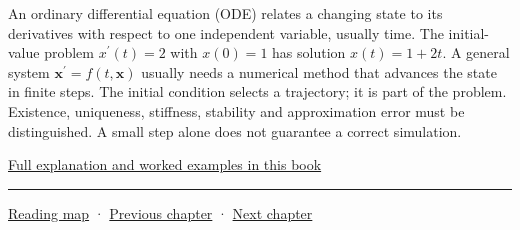 An ordinary differential equation (ODE) relates a changing state to its derivatives with respect to one independent variable, usually time. The initial-value problem \(x^{\prime}(t)=2\) with \(x(0)=1\) has solution \(x(t)=1+2t\). A general system \(\mathbf x^{\prime}=f(t,\mathbf x)\) usually needs a numerical method that advances the state in finite steps. The initial condition selects a trajectory; it is part of the problem. Existence, uniqueness, stiffness, stability and approximation error must be distinguished. A small step alone does not guarantee a correct simulation.

\hyperref[02-foundations-ii-ch025-odes-and-numerical-simulation]{Full explanation and worked examples in this book}

\begin{center}\rule{0.5\linewidth}{0.5pt}\end{center}

\hyperref[volume-reading-map]{Reading map} · \hyperref[01-foundations-i-ch020-choose-matrix-factorizations-from-structure]{Previous chapter} · \hyperref[02-foundations-ii-ch022-accumulation-quadrature-and-the-bridge-to-probability]{Next chapter}
